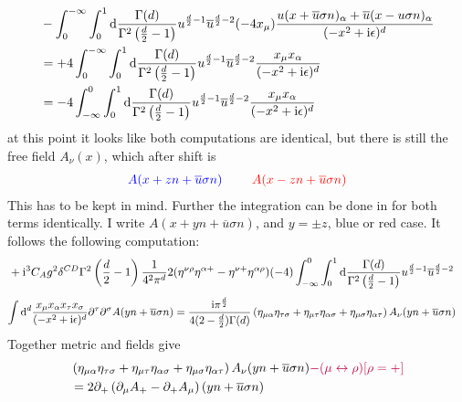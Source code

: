 {\color{red}
\begin{align}
	&-\int_{0}^{-\infty}\int_0^1 \text{d} \frac{\Gamma(d)}{\Gamma^2\left(\frac{d}{2}-1\right)} u^{\frac{d}{2}-1}\overline u ^{\frac{d}{2}-2}(-4x_\mu)\frac{u(x+\overline u \sigma n)_\alpha + \overline u(x- u\sigma n)_\alpha}{(-x^2+\text{i} \epsilon)^{d}}
	\\
	&=
	+4\int_{0}^{-\infty}\int_0^1 \text{d}  \frac{\Gamma(d)}{\Gamma^2\left(\frac{d}{2}-1\right)} u^{\frac{d}{2}-1}\overline u ^{\frac{d}{2}-2}\frac{x_\mu x_\alpha}{(-x^2+\text{i} \epsilon)^{d}}
	\\
	&=
	-4\int_{-\infty}^{0}\int_0^1 \text{d} \frac{\Gamma(d)}{\Gamma^2\left(\frac{d}{2}-1\right)} u^{\frac{d}{2}-1}\overline u ^{\frac{d}{2}-2}\frac{x_\mu x_\alpha}{(-x^2+\text{i} \epsilon)^{d}}
\end{align}
}
at this point it looks like both computations are identical, but there is still the free field $A_\nu(x)$, which after shift is
\begin{align}
	{\color{blue}A(x+zn+\overline u \sigma n)} ~~~~~~~ {\color{red}A(x-zn+\overline u \sigma n)}
\end{align}
This has to be kept in mind. 
Further the integration can be done in for both terms identically. I write $A(x+yn+\overline u \sigma n)$, and $y=\pm z$, blue or red case. It follows the following computation:
\begin{align}
	&+\text{i}^3 C_A g^2 \delta^{CD}\Gamma^2\left(\frac{d}{2}-1\right)\frac{1}{4^2\pi^d}2(\eta^{\nu \rho} \eta^{\alpha+} - \eta^{\nu +}\eta^{\alpha\rho})(-4)\int_{-\infty}^{0}\int_0^1 \text{d} \frac{\Gamma(d)}{\Gamma^2\left(\frac{d}{2}-1\right)} u^{\frac{d}{2}-1}\overline u ^{\frac{d}{2}-2}
\end{align}
\begin{align}
	 \int \text{d} ^d \frac{x_\mu x_\alpha x_\tau x_\sigma}{(-x^2+\text{i} \epsilon)^{d}}\partial^\tau \partial^\sigma A(yn+\overline u \sigma n) &= 
	\frac{\text{i} \pi^{\frac{d}{2}}}{4(2-\frac{d}{2})\Gamma(d)}\left(  \eta_{\mu \alpha} \eta_{\tau \sigma}+ \eta_{\mu \tau} \eta_{\alpha\sigma} + \eta_{\mu \sigma} \eta_{\alpha \tau} \right) A_\nu(yn+\overline u \sigma n)
\end{align}
Together metric  and fields give
\begin{align}
	&\left(  \eta_{\mu \alpha} \eta_{\tau \sigma}+ \eta_{\mu \tau} \eta_{\alpha\sigma} + \eta_{\mu \sigma} \eta_{\alpha \tau} \right) A_\nu(yn+\overline u \sigma n){\color{purple}- (\mu \leftrightarrow \rho)  [\rho = +]}
	\\
	&=2 \partial_+ \left( \partial_\mu A_+ - \partial_+ A_\mu \right)(yn+\overline u \sigma n)
\end{align}

